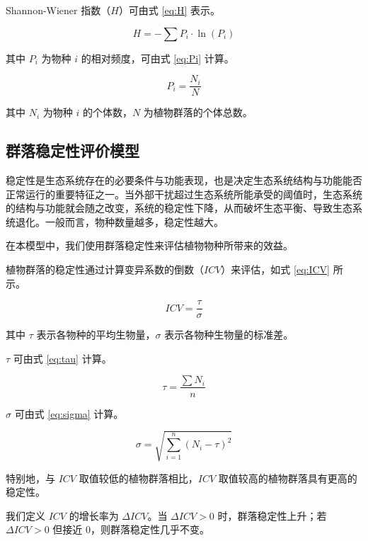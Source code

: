 \documentclass[11pt,a4paper]{ctexart}
\begin{document}
Shannon-Wiener 指数（$H$）可由式 \eqref{eq:H} 表示。

\begin{equation}
H=-\sum P_i\cdot \ln(P_i)
\label{eq:H}
\end{equation}

其中 $P_i$ 为物种 $i$ 的相对频度，可由式 \eqref{eq:Pi} 计算。

\begin{equation}
P_i=\frac{N_i}{N}
\label{eq:Pi}
\end{equation}

其中 $N_i$ 为物种 $i$ 的个体数，$N$ 为植物群落的个体总数。

\subsection{群落稳定性评价模型}

稳定性是生态系统存在的必要条件与功能表现，也是决定生态系统结构与功能能否正常运行的重要特征之一。当外部干扰超过生态系统所能承受的阈值时，生态系统的结构与功能就会随之改变，系统的稳定性下降，从而破坏生态平衡、导致生态系统退化\cite{ref12}。一般而言，物种数量越多，稳定性越大。

在本模型中，我们使用群落稳定性来评估植物物种所带来的效益。

植物群落的稳定性通过计算变异系数的倒数（$ICV$）来评估，如式 \eqref{eq:ICV} 所示。

\begin{equation}
ICV=\frac{\tau}{\sigma}
\label{eq:ICV}
\end{equation}

其中 $\tau$ 表示各物种的平均生物量，$\sigma$ 表示各物种生物量的标准差。

$\tau$ 可由式 \eqref{eq:tau} 计算。

\begin{equation}
\tau=\frac{\sum N_i}{n}
\label{eq:tau}
\end{equation}

$\sigma$ 可由式 \eqref{eq:sigma} 计算。

\begin{equation}
\sigma=\sqrt{\sum_{i=1}^{n}(N_i-\tau)^{2}}
\label{eq:sigma}
\end{equation}

特别地，与 $ICV$ 取值较低的植物群落相比，$ICV$ 取值较高的植物群落具有更高的稳定性\cite{ref13}。

我们定义 $ICV$ 的增长率为 $\Delta ICV$。当 $\Delta ICV>0$ 时，群落稳定性上升；若 $\Delta ICV>0$ 但接近 0，则群落稳定性几乎不变。
\end{document}
